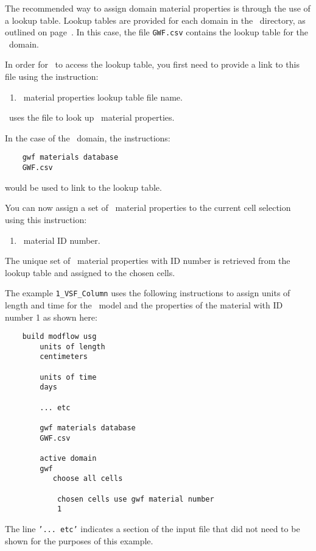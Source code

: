 {The recommended way to assign domain material properties is through the use of a lookup table.
\label{page:LookupTable}
\label{page:LookupTable}
Lookup tables are provided for each domain in the \bin\ directory, as outlined on page~\pageref{page:userbin}. In this case, the file \texttt{GWF.csv} contains the lookup table for the \gwf\ domain.

In order for \mut\ to access the lookup table, you first need to provide a link to this file using the instruction:

    {
        \squish
        \begin{enumerate}
        \item {}  \gwf\ material properties lookup table file name.
        \end{enumerate}
          \mut\ uses the file  to look up \gwf\ material properties.
    }

In the case of the \gwf\ domain, the instructions:
\begin{verbatim}
    gwf materials database
    GWF.csv
\end{verbatim}
would be used to link to the lookup table.

You can now assign a set of \gwf\ material properties to the current cell selection using this instruction:

    {
        \squish
        \begin{enumerate}
        \item {}  \gwf\ material ID number.
        \end{enumerate}
          The unique set of \gwf\ material properties with ID number  is retrieved from the lookup table and assigned to the chosen cells.
    }

The example \texttt{1\_VSF\_Column} uses the following instructions to assign units of length and time for the \mfus\ model and the properties of the material with ID number 1 as shown here:
\begin{verbatim}
    build modflow usg
        units of length
        centimeters

        units of time
        days

        ... etc

        gwf materials database
        GWF.csv

        active domain
        gwf
           choose all cells

            chosen cells use gwf material number
            1
\end{verbatim}
The line \texttt{'...\ etc'} indicates a section of the input file that did not need to be shown for the purposes of this example.

}

